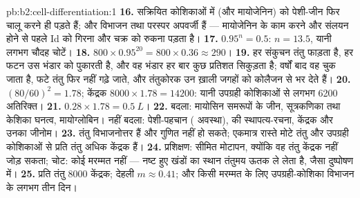 \begin{solution}{pb:b2:cell-differentiation:1}
\textbf{16.} सक्रियित कोशिकाओं में  (और मायोजेनिन) को पेशी-जीन फिर
चालू करने ही पड़ते हैं; और विभाजन तथा  परस्पर अपवर्जी हैं
--- मायोजेनिन के काम करने और संलयन होने से पहले Id को गिरना और चक्र को
रुकना पड़ता है।
\textbf{17.} $0.95^{n} = 0.5$: $n = 13.5$, यानी लगभग चौदह चोटें।
\textbf{18.} $800\times 0.95^{20} = 800\times 0.36 \approx 290$।
\textbf{19.} हर संकुचन तंतु फाड़ता है, हर फटन उस भंडार को पुकारती है,
और वह भंडार हर बार कुछ प्रतिशत सिकुड़ता है; वर्षों बाद वह चुक जाता है,
फटे तंतु फिर नहीं गढ़े जाते, और तंतुकोरक उन ख़ाली जगहों को कोलैजन से भर देते हैं।
\textbf{20.} $(80/60)^{2} = 1.78$; केंद्रक $8000\times 1.78 = \num{14200}$:
यानी उपग्रही कोशिकाओं से लगभग \num{6200} अतिरिक्त।
\textbf{21.} $0.28\times 1.78 = \qty{0.5}{L}$।
\textbf{22.} बदला: मायोसिन समरूपों के जीन, सूत्रकणिका तथा
केशिका घनत्व, मायोग्लोबिन। नहीं बदला: पेशी-पहचान (
अवस्था),  की स्थापत्य-रचना, केंद्रक और उनका जीनोम।
\textbf{23.} तंतु विभाजनोत्तर हैं और गुणित नहीं हो सकते; एकमात्र
रास्ते मोटे तंतु और उपग्रही कोशिकाओं से प्रति तंतु अधिक केंद्रक हैं।
\textbf{24.} प्रशिक्षण: सीमित मोटापन, क्योंकि वह तंतु केंद्रक नहीं जोड़
सकता; चोट: कोई मरम्मत नहीं --- नष्ट हुए खंडों का स्थान
तंतुमय ऊतक ले लेता है, जैसा दुष्पोषण में।
\textbf{25.} प्रति तंतु \num{8000} केंद्रक; देहली $m \approx 0.41$;
और किसी मरम्मत के लिए उपग्रही-कोशिका विभाजन के लगभग तीन दिन।
\end{solution}
